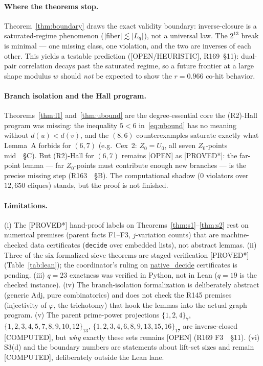 \documentclass[11pt,a4paper]{article}
\theoremstyle{definition}
\begin{document}
\paragraph{Where the theorems stop.} Theorem~\ref{thm:boundary} draws the
exact validity boundary: inverse-closure is a saturated-regime
phenomenon ($|{\rm fiber}|\lesssim|L_q|$), not a universal law. The
$2^{13}$ break is minimal --- one missing class, one violation, and the
two are inverses of each other. This yields a testable prediction
([OPEN/HEURISTIC], R169~\S11): dual-pair correlation decays past the
saturated regime, so a future frontier at a large shape modulus $w$
should \emph{not} be expected to show the $r=0.966$ co-hit behavior.

\paragraph{Branch isolation and the Hall program.} Theorems~\ref{thm:l1}
and~\ref{thm:ubound} are the degree-essential core the (R2)-Hall
program was missing: the inequality $5<6$ in~\eqref{eq:ubound} has no
meaning without $d(u)<d(v)$, and the $(8,6)$ counterexamples saturate
exactly what Lemma~A forbids for $(6,7)$ (e.g.\ Cex~2:
$Z_0=U_0$, all seven $Z_0$-points mid~\cite{R163}~\S C). But (R2)-Hall
for $(6,7)$ remains [OPEN] as [PROVED*]: the far-point lemma ---
far $Z_0$-points must contribute enough new branches --- is the precise
missing step (R163~\cite{R163}~\S B). The computational shadow
($0$ violators over $12{,}650$ cliques) stands, but the proof is not
finished.

\paragraph{Limitations.} (i) The [PROVED*] hand-proof labels on
Theorems~\ref{thm:s1}--\ref{thm:s2} rest on numerical premises
(parent facts F1--F3, $j$-variation counts) that are machine-checked
data certificates (\texttt{decide} over embedded lists), not abstract
lemmas. (ii) Three of the six formalized sieve theorems are
staged-verification [PROVED*] (Table~\ref{tab:lean}); the coordinator's
ruling on \url{native_decide} certificates is pending.
(iii) $q=23$ exactness was verified in Python, not in Lean ($q=19$ is
the checked instance). (iv) The branch-isolation formalization is
deliberately abstract (generic $\mathrm{Adj}$, pure combinatorics) and
does not check the R145 premises (injectivity of $\varphi$, the
trichotomy) that hook the lemmas into the actual graph program.
(v) The parent prime-power projections $\{1,2,4\}_7$,
$\{1,2,3,4,5,7,8,9,10,12\}_{13}$,
$\{1,2,3,4,6,8,9,13,15,16\}_{17}$ are inverse-closed [COMPUTED], but
\emph{why} exactly these sets remains [OPEN] (R169 F3~\cite{R169}~\S11).
(vi) S3(d) and the boundary numbers are statements about lift-set
sizes and remain [COMPUTED], deliberately outside the Lean lane.
\end{document}
